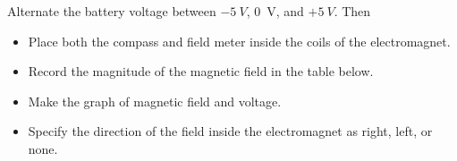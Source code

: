 \documentclass[]{exam}
\begin{document}
\begin{questions}

\clearpage

\question
Alternate the battery voltage between $\SI{-5}{V}$, \SI{0}{V}, and $+\SI{5}{V}$. Then

\begin{itemize}
    \item Place both the compass and field meter inside the coils of the electromagnet.
    \item Record the magnitude of the magnetic field in the table below. 
    \item Make the graph of magnetic field and voltage.
    \item Specify the direction of the field inside the electromagnet as right, left, or none.
\end{itemize}



\end{questions}
\end{document}

